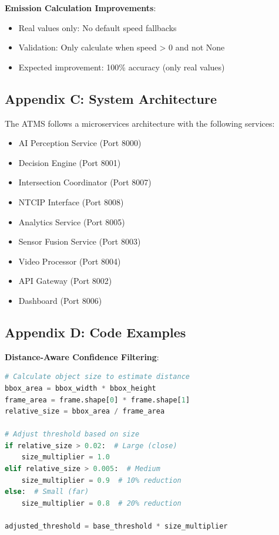 \documentclass[12pt,a4paper]{article}
\begin{document}
\textbf{Emission Calculation Improvements}:
\begin{itemize}
    \item Real values only: No default speed fallbacks
    \item Validation: Only calculate when speed > 0 and not None
    \item Expected improvement: 100\% accuracy (only real values)
\end{itemize}

\subsection*{Appendix C: System Architecture}

The ATMS follows a microservices architecture with the following services:
\begin{itemize}
    \item AI Perception Service (Port 8000)
    \item Decision Engine (Port 8001)
    \item Intersection Coordinator (Port 8007)
    \item NTCIP Interface (Port 8008)
    \item Analytics Service (Port 8005)
    \item Sensor Fusion Service (Port 8003)
    \item Video Processor (Port 8004)
    \item API Gateway (Port 8002)
    \item Dashboard (Port 8006)
\end{itemize}

\subsection*{Appendix D: Code Examples}

\textbf{Distance-Aware Confidence Filtering}:
\begin{lstlisting}[language=Python]
# Calculate object size to estimate distance
bbox_area = bbox_width * bbox_height
frame_area = frame.shape[0] * frame.shape[1]
relative_size = bbox_area / frame_area

# Adjust threshold based on size
if relative_size > 0.02:  # Large (close)
    size_multiplier = 1.0
elif relative_size > 0.005:  # Medium
    size_multiplier = 0.9  # 10% reduction
else:  # Small (far)
    size_multiplier = 0.8  # 20% reduction

adjusted_threshold = base_threshold * size_multiplier
\end{lstlisting}
\end{document}
